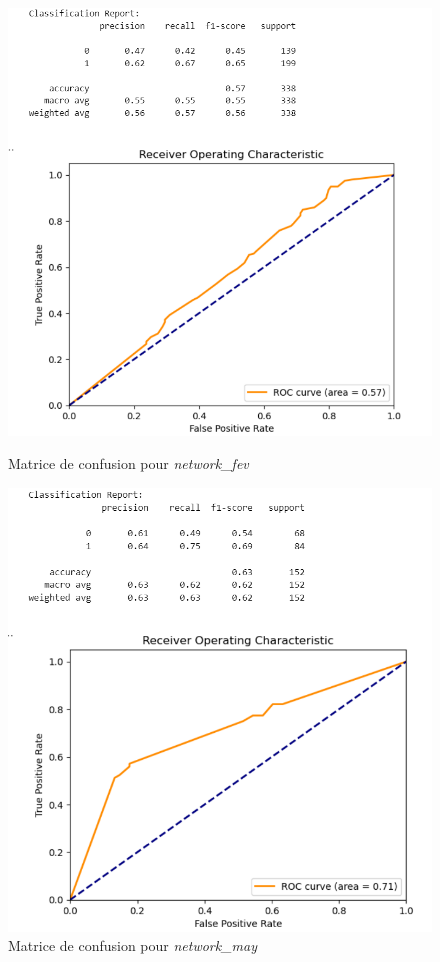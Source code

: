 \begin{figure}[H]
    \centering
    \begin{minipage}{0.45\textwidth}
        \centering
        \includegraphics[width=\linewidth]{capture_modele_6.png}
        \caption{Matrice de confusion pour \textit{network\_fev}}
    \end{minipage}
    \hfill
    \begin{minipage}{0.45\textwidth}
        \centering
        \includegraphics[width=\linewidth]{capture_modele_7.png}
        \caption{Matrice de confusion pour \textit{network\_may}}
    \end{minipage}
\end{figure}


